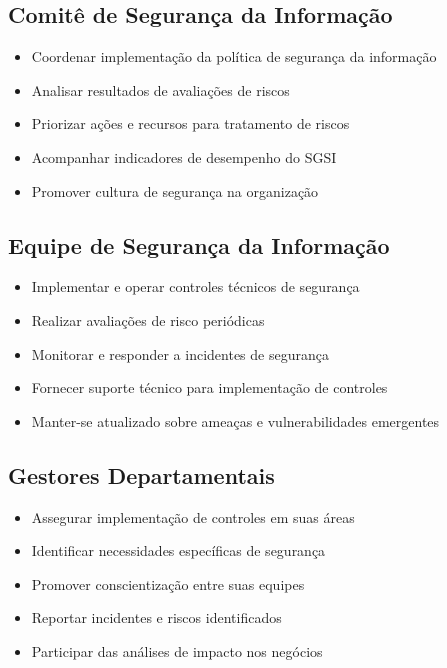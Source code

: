 \documentclass[12pt,a4paper]{report}
\begin{document}
\subsection{Comitê de Segurança da Informação}

\begin{itemize}
  \item Coordenar implementação da política de segurança da informação
  \item Analisar resultados de avaliações de riscos
  \item Priorizar ações e recursos para tratamento de riscos
  \item Acompanhar indicadores de desempenho do SGSI
  \item Promover cultura de segurança na organização
\end{itemize}

\subsection{Equipe de Segurança da Informação}

\begin{itemize}
  \item Implementar e operar controles técnicos de segurança
  \item Realizar avaliações de risco periódicas
  \item Monitorar e responder a incidentes de segurança
  \item Fornecer suporte técnico para implementação de controles
  \item Manter-se atualizado sobre ameaças e vulnerabilidades emergentes
\end{itemize}

\subsection{Gestores Departamentais}

\begin{itemize}
  \item Assegurar implementação de controles em suas áreas
  \item Identificar necessidades específicas de segurança
  \item Promover conscientização entre suas equipes
  \item Reportar incidentes e riscos identificados
  \item Participar das análises de impacto nos negócios
\end{itemize}
\end{document}
